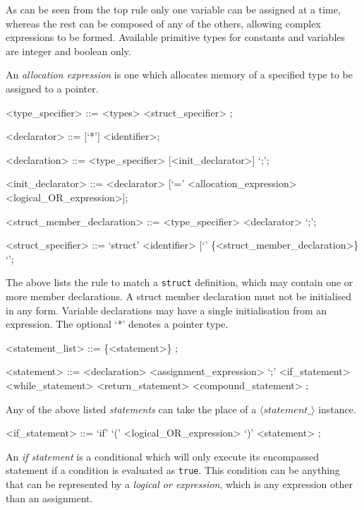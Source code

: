 \documentclass[a4paper,11pt]{article}
\begin{document}
As can be seen from the top rule only one variable can be assigned at a time, whereas the rest can be composed of any of the others, allowing complex expressions to be formed.
Available primitive types for constants and variables are integer and boolean only.

An \textit{allocation expression} is one which allocates memory of a specified type to be assigned to a pointer.

\begin{grammar}
        <type_specifier> ::=
                <types>
            \alt   <struct_specifier>
            ;

        <declarator> ::= [`*'] <identifier>;
        
	<declaration> ::= <type_specifier> [<init_declarator>] `;';

        <init_declarator> ::= <declarator>
        [`=' <allocation_expression>
        \alt <logical_OR_expression>];


        <struct_member_declaration> ::= <type_specifier> <declarator> `;';

        <struct_specifier> ::=
                `struct' <identifier> [`{' \{<struct_member_declaration>\} `}';
\end{grammar}
The above lists the rule to match a \verb+struct+ definition, which may contain one or more member declarations.
A struct member declaration must not be initialised in any form.
Variable declarations may have a single initialisation from an expression.
The optional `*' denotes a pointer type.

\begin{grammar}
<statement_list> ::=
    \{<statement>\}
    ;

<statement> ::=
	<declaration>
    \alt   <assignment_expression> `;'
    \alt   <if_statement>
    \alt   <while_statement>
    \alt   <return_statement>
    \alt   <compound_statement>
    ;
\end{grammar}

Any of the above listed \textit{statements} can take the place of a $\langle statement\_\rangle$ instance.

\begin{grammar}
<if_statement> ::=
	`if'
       `('
       <logical_OR_expression>
       `)'
       <statement>
    ;
\end{grammar}

An \textit{if statement} is a conditional which will only execute its encompassed statement if a condition is evaluated as \verb+true+.
This condition can be anything that can be represented by a \textit{logical or expression}, which is any expression other than an assignment.
\end{document}

